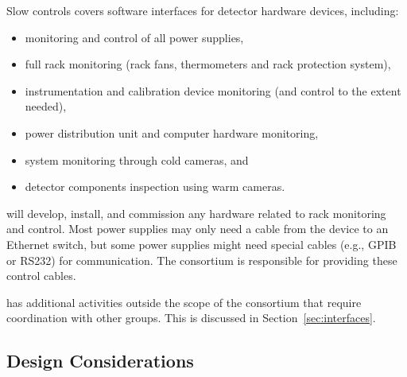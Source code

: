 Slow controls %
covers software interfaces for detector hardware devices, including:
\begin{itemize}
\item monitoring and control of all power supplies,
\item full rack monitoring (rack fans, thermometers and rack protection system),
\item instrumentation and calibration device monitoring (and control to the extent needed),
\item power distribution unit and computer hardware monitoring,
\item {} system monitoring through cold cameras, and
\item detector components inspection %
using warm cameras.
\end{itemize}
%
 will develop, install, and commission any hardware related to rack monitoring and control. Most power supplies may only need a cable from the device
to an Ethernet switch, but some power supplies might need special cables (e.g., GPIB or RS232) for communication. The  consortium is responsible for providing these control cables.

has additional activities outside the scope of the consortium that require coordination with other groups. This is discussed in Section~\ref{sec:interfaces}.

\subsection{Design Considerations}

